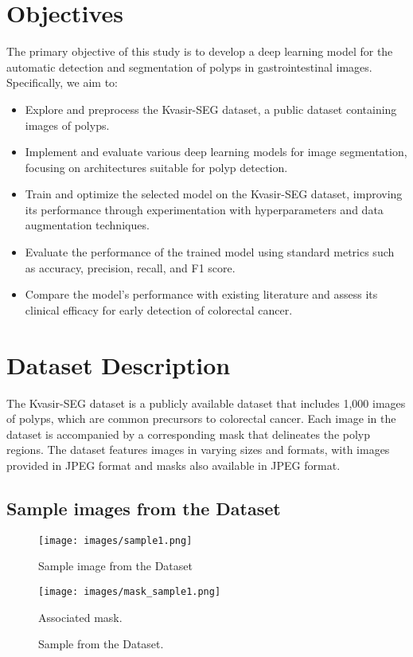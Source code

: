 \documentclass[12pt]{article}
\begin{document}
\section{Objectives}
The primary objective of this study is to develop a deep learning model for the automatic detection and segmentation of polyps in gastrointestinal images. Specifically, we aim to:
\begin{itemize}
    \item Explore and preprocess the Kvasir-SEG dataset, a public dataset containing images of polyps.
    \item Implement and evaluate various deep learning models for image segmentation, focusing on architectures suitable for polyp detection.
    \item Train and optimize the selected model on the Kvasir-SEG dataset, improving its performance through experimentation with hyperparameters and data augmentation techniques.
    \item Evaluate the performance of the trained model using standard metrics such as accuracy, precision, recall, and F1 score.
    \item Compare the model's performance with existing literature and assess its clinical efficacy for early detection of colorectal cancer.
\end{itemize}

\section{Dataset Description}
The Kvasir-SEG dataset is a publicly available dataset that includes 1,000 images of polyps, which are common precursors to colorectal cancer. Each image in the dataset is accompanied by a corresponding mask that delineates the polyp regions. The dataset features images in varying sizes and formats, with images provided in JPEG format and masks also available in JPEG format.

\subsection{Sample images from the Dataset}

\begin{figure}[ht]
    \centering
    \begin{minipage}{0.45\textwidth}
        \centering
        \texttt{[image: images/sample1.png]}
        \caption{Sample image from the Dataset}
        \label{fig:image1}
    \end{minipage}
    \hfill
    \begin{minipage}{0.45\textwidth}
        \centering
        \texttt{[image: images/mask\_sample1.png]}
        \caption{Associated mask.}
        \label{fig:image2}
    \end{minipage}
    \caption{Sample from the Dataset.}
    \label{fig:two_images}
\end{figure}
\end{document}
